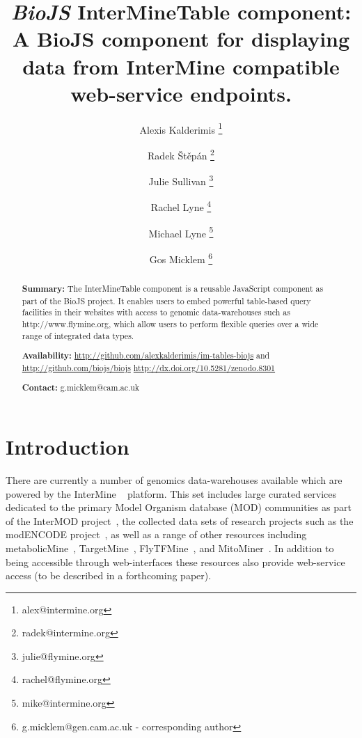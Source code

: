 \documentclass[10pt,a4paper,twocolumn]{article}
\begin{document}
\title{\textit{BioJS} InterMineTable component:
A BioJS component for displaying data from InterMine compatible web-service endpoints.
}

\author[1]{Alexis Kalderimis \thanks{alex@intermine.org}}
\author[1]{Radek Štěpán \thanks{radek@intermine.org}}
\author[1]{Julie Sullivan \thanks{julie@flymine.org}}
\author[1]{Rachel Lyne \thanks{rachel@flymine.org}}
\author[1]{Michael Lyne \thanks{mike@intermine.org}}
\author[1]{Gos Micklem \thanks{g.micklem@gen.cam.ac.uk - corresponding author}}

\maketitle
\thispagestyle{fancy}

\begin{abstract}

\textbf{Summary:}
The InterMineTable component is a reusable JavaScript
component as part of the BioJS project. It enables users to embed
powerful table-based query facilities in their websites with
access to genomic data-warehouses such as http://www.flymine.org,
which allow users to perform flexible queries over a wide range
of integrated data types.

\textbf{Availability:}
\url{http://github.com/alexkalderimis/im-tables-biojs} and
\url{http://github.com/biojs/biojs}
\url{http://dx.doi.org/10.5281/zenodo.8301}

\textbf{Contact:} g.micklem@cam.ac.uk

\end{abstract}
\clearpage

\section*{Introduction}

There are currently a number of genomics data-warehouses available which are
powered by the InterMine ~\cite{smith2012} platform. This set includes large
curated services dedicated to the primary Model Organism database (MOD)
communities as part of the InterMOD project~\cite{sullivan2013}, the collected
data sets of research projects such as the modENCODE
project~\cite{contrino2012}, as well as a range of other resources including
metabolicMine~\cite{metabolicmine}, TargetMine~\cite{targetmine},
FlyTFMine~\cite{flytfmine}, and MitoMiner~\cite{mitominer}.  In addition to
being accessible through web-interfaces these resources also provide web-service
access (to be described in a forthcoming paper).
\end{document}
